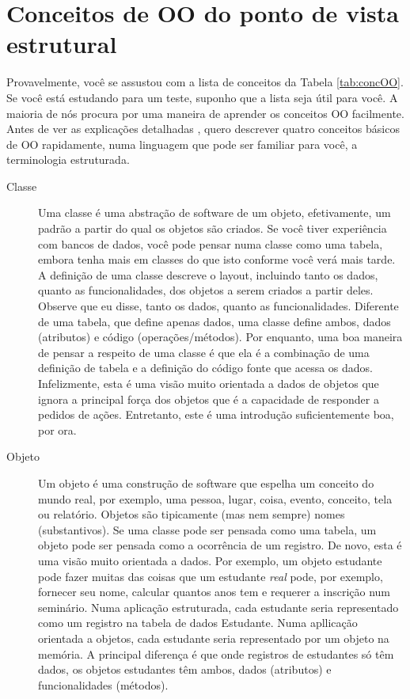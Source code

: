 \documentclass[
	article,			%
	12pt,				%
	openright,
	twoside,			%
	a4paper,			%
	english,			%
	french,
	brazil,				%
	sumario=tradicional
	]{abntex2}
\begin{document}
\section{Conceitos de OO do ponto de vista estrutural}

Provavelmente, você se assustou com a lista de conceitos da Tabela \ref{tab:concOO}. Se você está estudando para um teste, suponho que a lista seja útil para você. A maioria de nós procura por uma maneira de aprender os conceitos OO facilmente. Antes de ver as explicações detalhadas , quero descrever quatro conceitos básicos de OO rapidamente, numa linguagem que pode ser familiar para você, a terminologia estruturada.

\begin{description}
\item[Classe] Uma classe é uma abstração de software de um objeto, efetivamente, um padrão a partir do qual os objetos são criados. Se você tiver experiência com bancos de dados, você pode pensar numa classe como uma tabela, embora tenha mais em classes do que isto conforme você verá mais tarde. A definição de uma classe descreve o layout, incluindo tanto os dados, quanto as funcionalidades, dos objetos a serem criados a partir deles. Observe que eu disse, tanto os dados, quanto as funcionalidades. Diferente de uma tabela, que define apenas dados, uma classe define ambos, dados (atributos) e código (operações/métodos). Por enquanto, uma boa maneira de pensar a respeito de uma classe é que ela é a combinação de uma definição de tabela e a definição do código fonte que acessa os dados. Infelizmente, esta é uma visão muito orientada a dados de objetos que ignora a principal força dos objetos que é a capacidade de responder a pedidos de ações. Entretanto, este é uma introdução suficientemente boa, por ora.

\item[Objeto] Um objeto é uma construção de software que espelha um conceito do mundo real, por exemplo, uma pessoa, lugar, coisa, evento, conceito, tela ou relatório. Objetos são tipicamente (mas nem sempre) nomes (substantivos). Se uma classe pode ser pensada como uma tabela, um objeto pode ser pensada como a ocorrência de um registro. De novo, esta é uma visão muito orientada a dados. Por exemplo, um objeto estudante pode fazer muitas das coisas que um estudante \emph{real} pode, por exemplo, fornecer seu nome, calcular quantos anos tem e requerer a inscrição num seminário. Numa aplicação estruturada, cada estudante seria representado como um registro na tabela de dados Estudante. Numa apllicação orientada a objetos, cada estudante seria representado por um objeto na memória. A principal diferença é que onde registros de estudantes só têm dados, os objetos estudantes têm ambos, dados (atributos) e funcionalidades (métodos).


\end{description}
\end{document}

